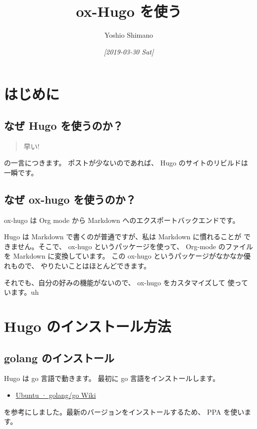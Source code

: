 \documentclass[dvipdfmx,a4j,14pt,uplatex,openany]{jsbook}
\author{Yoshio Shimano}
\date{\textit{[2019-03-30 Sat]}}
\title{ox-Hugo を使う}
\begin{document}
\maketitle
\color{Black!95!White}

\chapter{はじめに}
\label{sec:orgcfdd19e}
\section{なぜ Hugo を使うのか？}
\label{sec:org757c626}
\begin{quote}
早い!
\end{quote}

の一言につきます。
ポストが少ないのであれば、 Hugo のサイトのリビルドは一瞬です。



\section{なぜ ox-hugo を使うのか？}
\label{sec:orgbfd9aef}
ox-hugo は Org mode から Markdown へのエクスポートバックエンドです。

Hugo は Markdown で書くのが普通ですが、私は Markdown に慣れることが
できません。そこで、 ox-hugo というパッケージを使って、
Org-mode のファイルを Markdown に変換しています。
この ox-hugo というパッケージがなかなか優れもので、
やりたいことはほとんどできます。

それでも、自分の好みの機能がないので、 ox-hugo をカスタマイズして
使っています。uh

\chapter{Hugo のインストール方法}
\label{sec:org82b8f56}
\section{golang のインストール}
\label{sec:org36a47fd}
Hugo は go 言語で動きます。
最初に go 言語をインストールします。

\begin{itemize}
\item \href{https://github.com/golang/go/wiki/Ubuntu}{Ubuntu · golang/go Wiki}
\end{itemize}

を参考にしました。最新のバージョンをインストールするため、
PPA を使います。
\end{document}
